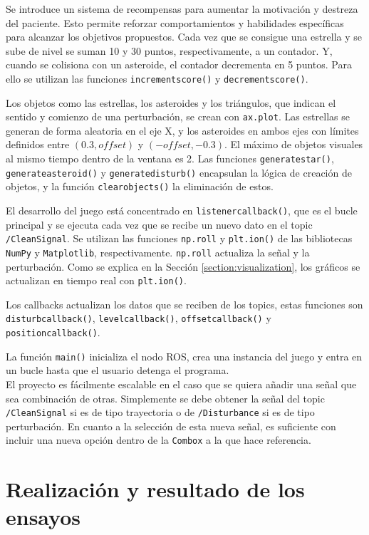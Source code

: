 Se introduce un sistema de recompensas para aumentar la motivación y destreza del paciente.
Esto permite reforzar comportamientos y habilidades específicas para alcanzar los objetivos propuestos.
Cada vez que se consigue una estrella y se sube de nivel se suman 10 y 30 puntos, respectivamente, a un contador.
Y, cuando se colisiona con un asteroide, el contador decrementa en 5 puntos.
Para ello se utilizan las funciones \verb|incrementscore()| y \verb|decrementscore()|.

Los objetos como las estrellas, los asteroides y los triángulos, que indican el sentido y comienzo de una perturbación, se crean con \verb|ax.plot|.
Las estrellas se generan de forma aleatoria en el eje X, y los asteroides en ambos ejes con límites definidos entre $(0.3, offset)$ y $(-offset, -0.3)$.
El máximo de objetos visuales al mismo tiempo dentro de la ventana es 2.
Las funciones \verb|generatestar()|, \verb|generateasteroid()| y \verb|generatedisturb()| encapsulan la lógica de creación de objetos, y la función \verb|clearobjects()| la eliminación de estos.

El desarrollo del juego está concentrado en \verb|listenercallback()|, que es el bucle principal y se ejecuta cada vez que se recibe un nuevo dato en el topic \verb|/CleanSignal|.
Se utilizan las funciones \verb|np.roll| y \verb|plt.ion()| de las bibliotecas \verb|NumPy| y \verb|Matplotlib|, respectivamente.
\verb|np.roll| actualiza la señal y la perturbación.
Como se explica en la Sección \ref{section:visualization}, los gráficos se actualizan en tiempo real con \verb|plt.ion()|.

Los callbacks actualizan los datos que se reciben de los topics, estas funciones son \verb|disturbcallback()|, \verb|levelcallback()|, \verb|offsetcallback()| y \verb|positioncallback()|.

La función \verb|main()| inicializa el nodo ROS, crea una instancia del juego y entra en un bucle hasta que el usuario detenga el programa.\\

El proyecto es fácilmente escalable en el caso que se quiera añadir una señal que sea combinación de otras.
Simplemente se debe obtener la señal del topic \verb|/CleanSignal| si es de tipo trayectoria o de \verb|/Disturbance| si es de tipo perturbación.
En cuanto a la selección de esta nueva señal, es suficiente con incluir una nueva opción dentro de la \verb|Combox| a la que hace referencia.

\section{Realización y resultado de los ensayos}
\label{section:encuestas}
